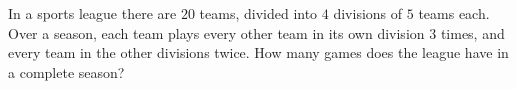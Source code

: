 In a sports league there are $20$ teams, divided into $4$ divisions of $5$ teams each. Over a season, each team plays every other team in its own division $3$ times, and every team in the other divisions twice. How many games does the league have in a complete season?
